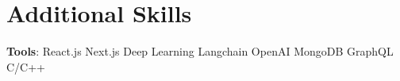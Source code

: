 

\section{Additional Skills}
\begin{itemize}[leftmargin=0.15in, label={}]
\small{\item{\textbf{Tools}:
    React.js\hspace{0.1em}\resumeDot\hspace{0.1em}
    Next.js\hspace{0.1em}\resumeDot\hspace{0.1em}
    Deep Learning\hspace{0.1em}\resumeDot\hspace{0.1em}
    Langchain\hspace{0.1em}\resumeDot\hspace{0.1em}
    OpenAI\hspace{0.1em}\resumeDot\hspace{0.1em}
    MongoDB\hspace{0.1em}\resumeDot\hspace{0.1em}
    GraphQL\hspace{0.1em}\resumeDot\hspace{0.1em}
    C/C++
    }}



\end{itemize}
